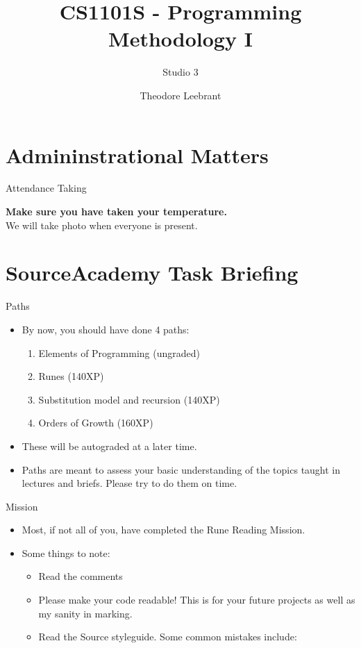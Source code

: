 \documentclass[10pt]{beamer}
\title{CS1101S - Programming Methodology I}
\subtitle{Studio 3}
\date{}
\author{Theodore Leebrant}
\institute{Tutorial Group 8D}
\begin{document}
\maketitle

\section[Admin Stuff]{Admininstrational Matters}

\begin{frame}[fragile]{Attendance Taking}
\begin{centering}
\textbf{Make sure you have taken your temperature.} \\
We will take photo when everyone is present. \\
\end{centering}
\end{frame}

\section[Regarding SourceAcademy tasks]{SourceAcademy Task Briefing}

\begin{frame}[fragile]{Paths}
  \begin{itemize}
    \item By now, you should have done 4 paths:
    \begin{enumerate}
      \item Elements of Programming (ungraded)
      \item Runes (140XP)
      \item Substitution model and recursion (140XP)
      \item Orders of Growth (160XP)
    \end{enumerate}
    \item These will be autograded at a later time.
    \item Paths are meant to assess your basic understanding of the topics taught in lectures and briefs. Please try to do them on time.
  \end{itemize}
\end{frame}

\begin{frame}[fragile]{Mission}
  \begin{itemize}
    \item Most, if not all of you, have completed the Rune Reading Mission.
    \item Some things to note:
    \begin{itemize}
      \item Read the comments 
      \item Please make your code readable! This is for your future projects as well as my sanity in marking.
      \item Read the Source styleguide. Some common mistakes include:
    \end{itemize}
  \end{itemize}
\end{frame}
\end{document}

